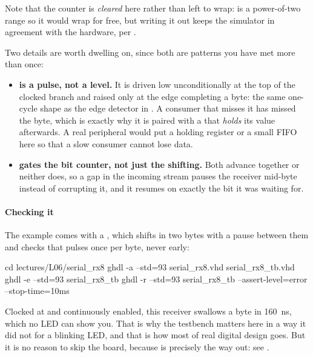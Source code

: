 Note that the counter is \emph{cleared} here rather than left to wrap:  is a
power-of-two range so it would wrap for free, but writing it out keeps the simulator in agreement
with the hardware, per .

Two details are worth dwelling on, since both are patterns you have met more than once:
\begin{itemize}
  \item \textbf{ is a pulse, not a level.} It is driven low unconditionally at the
    top of the clocked branch and raised only at the edge completing a byte: the same one-cycle
    shape as the edge detector in . A consumer that misses it has missed the
    byte, which is exactly why it is paired with a  that \emph{holds} its value
    afterwards. A real peripheral would put a holding register or a small FIFO here so that a slow
    consumer cannot lose data.
  \item \textbf{ gates the bit counter, not just the shifting.} Both advance
    together or neither does, so a gap in the incoming stream pauses the receiver mid-byte instead
    of corrupting it, and it resumes on exactly the bit it was waiting for.
\end{itemize}

\paragraph{Checking it}
The example comes with a , which shifts in two bytes with a pause between
them and checks that  pulses once per byte, never early:

\begin{shell}
cd lectures/L06/serial_rx8
ghdl -a --std=93 serial_rx8.vhd serial_rx8_tb.vhd
ghdl -e --std=93 serial_rx8_tb
ghdl -r --std=93 serial_rx8_tb --assert-level=error --stop-time=10ms
\end{shell}

Clocked at  and continuously enabled, this receiver swallows a byte in 160~ns, which no
LED can show you. That is why the testbench matters here in a way it did not for a blinking LED, and
that is how most of real digital design goes. But it is no reason to skip the board, because
 is precisely the way out: see .

